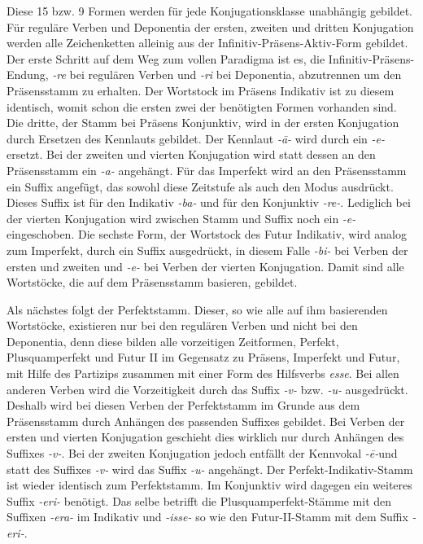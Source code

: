 Diese 15 bzw. 9 Formen werden für jede Konjugationsklasse unabhängig gebildet. Für reguläre Verben und Deponentia der ersten, zweiten und dritten Konjugation werden alle Zeichenketten alleinig aus der Infinitiv-Präsens-Aktiv-Form gebildet. Der erste Schritt auf dem Weg zum vollen Paradigma ist es, die Infinitiv-Präsens-Endung, \textit{-re} bei regulären Verben und \textit{-ri} bei Deponentia, abzutrennen um den Präsensstamm zu erhalten. Der Wortstock im Präsens Indikativ ist zu diesem identisch, womit schon die ersten zwei der benötigten Formen vorhanden sind. Die dritte, der Stamm bei Präsens Konjunktiv, wird in der ersten Konjugation durch Ersetzen des Kennlauts gebildet. Der Kennlaut \textit{-ā-} wird durch ein \textit{-e-} ersetzt. Bei der zweiten und vierten Konjugation wird statt dessen an den Präsensstamm ein \textit{-a-} angehängt. Für das Imperfekt wird an den Präsensstamm ein Suffix angefügt, das sowohl diese Zeitstufe als auch den Modus ausdrückt. Dieses Suffix ist für den Indikativ \textit{-ba-} und für den Konjunktiv \textit{-re-}. Lediglich bei der vierten Konjugation wird zwischen Stamm und Suffix noch ein \textit{-e-} eingeschoben. Die sechste Form, der Wortstock des Futur Indikativ, wird analog zum Imperfekt, durch ein Suffix ausgedrückt, in diesem Falle \textit{-bi-} bei Verben der ersten und zweiten und \textit{-e-} bei Verben der vierten Konjugation. Damit sind alle Wortstöcke, die auf dem Präsensstamm basieren, gebildet. \par
Als nächstes folgt der Perfektstamm. Dieser, so wie alle auf ihm basierenden Wortstöcke, existieren nur bei den regulären Verben und nicht bei den Deponentia, denn diese bilden alle vorzeitigen Zeitformen, Perfekt, Plusquamperfekt und Futur II im Gegensatz zu Präsens, Imperfekt und Futur, mit Hilfe des Partizips zusammen mit einer Form des Hilfsverbs \textit{esse}. Bei allen anderen Verben wird die Vorzeitigkeit durch das Suffix \textit{-v-} bzw. \textit{-u-} ausgedrückt. Deshalb wird bei diesen Verben der Perfektstamm im Grunde aus dem Präsensstamm durch Anhängen des passenden Suffixes gebildet. Bei Verben der ersten und vierten Konjugation geschieht dies wirklich nur durch Anhängen des Suffixes \textit{-v-}. Bei der zweiten Konjugation jedoch entfällt der Kennvokal \textit{-ē-}und statt des Suffixes \textit{-v-} wird das Suffix \textit{-u-} angehängt. Der Perfekt-Indikativ-Stamm ist wieder identisch zum Perfektstamm. Im Konjunktiv wird dagegen ein weiteres Suffix \textit{-eri-} benötigt. Das selbe betrifft die Plusquamperfekt-Stämme mit den Suffixen \textit{-era-} im Indikativ und \textit{-isse-} so wie den Futur-II-Stamm mit dem Suffix \textit{-eri-}. \par
